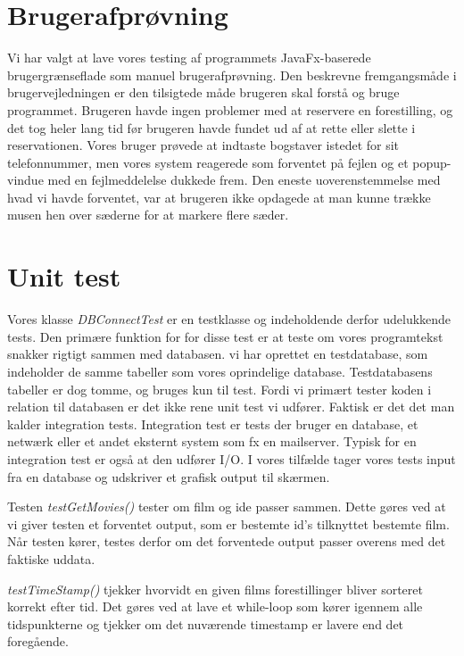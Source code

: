 \documentclass[final]{report}
\begin{document}
\section{Brugerafprøvning}
Vi har valgt at lave vores testing af programmets JavaFx-baserede brugergrænseflade som manuel brugerafprøvning. Den beskrevne fremgangsmåde i brugervejledningen er den tilsigtede måde brugeren skal forstå og bruge programmet.
Brugeren havde ingen problemer med at reservere en forestilling, og det tog heler lang tid før brugeren havde fundet ud af at rette eller slette i reservationen. Vores bruger prøvede at indtaste bogstaver istedet for sit telefonnummer, men vores system reagerede som forventet på fejlen og et popup-vindue med en fejlmeddelelse dukkede frem. Den eneste uoverenstemmelse med hvad vi havde forventet, var at brugeren ikke opdagede at man kunne trække musen hen over sæderne for at markere flere sæder.  

\section{Unit test}
Vores klasse \emph{DBConnectTest} er en testklasse og indeholdende derfor udelukkende tests. Den primære funktion for for disse test er at teste om vores programtekst snakker rigtigt sammen med databasen. vi har oprettet en testdatabase, som indeholder de samme tabeller som vores oprindelige database. Testdatabasens tabeller er dog tomme, og bruges kun til test. 
Fordi vi primært tester koden i relation til databasen er det ikke rene unit test vi udfører. Faktisk er det det man kalder integration tests. Integration test er tests der bruger en database, et netwærk eller et andet eksternt system som fx en mailserver. Typisk for en integration test er også at den udfører I/O. I vores tilfælde tager vores tests input fra en database og udskriver et grafisk output til skærmen. \linebreak

Testen \emph{testGetMovies()} tester om film og ide passer sammen. Dette gøres ved at vi giver testen et forventet output, som er bestemte id's tilknyttet bestemte film. Når testen kører, testes derfor om det forventede output passer overens med det faktiske uddata. 

\emph{testTimeStamp()} tjekker hvorvidt en given films forestillinger bliver sorteret korrekt efter tid. Det gøres ved at lave et while-loop som kører igennem alle tidspunkterne og tjekker om det nuværende timestamp er lavere end det foregående.
\end{document}
